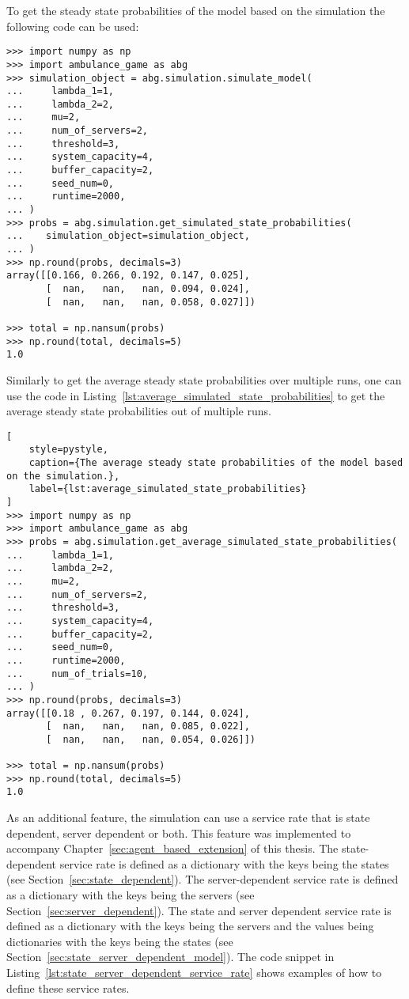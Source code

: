 To get the steady state probabilities of the model based on the simulation the
following code can be used:

\begin{lstlisting}[style=pystyle]
>>> import numpy as np
>>> import ambulance_game as abg
>>> simulation_object = abg.simulation.simulate_model(
...     lambda_1=1,
...     lambda_2=2,
...     mu=2,
...     num_of_servers=2,
...     threshold=3,
...     system_capacity=4,
...     buffer_capacity=2,
...     seed_num=0,
...     runtime=2000,
... )
>>> probs = abg.simulation.get_simulated_state_probabilities(
...    simulation_object=simulation_object,
... )
>>> np.round(probs, decimals=3)
array([[0.166, 0.266, 0.192, 0.147, 0.025],
       [  nan,   nan,   nan, 0.094, 0.024],
       [  nan,   nan,   nan, 0.058, 0.027]])

>>> total = np.nansum(probs)
>>> np.round(total, decimals=5)
1.0

\end{lstlisting}

Similarly to get the average steady state probabilities over multiple runs,
one can use the code in Listing~\ref{lst:average_simulated_state_probabilities}
to get the average steady state probabilities out of multiple runs.

\begin{lstlisting}[
    style=pystyle,
    caption={The average steady state probabilities of the model based on the simulation.},
    label={lst:average_simulated_state_probabilities}
]
>>> import numpy as np
>>> import ambulance_game as abg
>>> probs = abg.simulation.get_average_simulated_state_probabilities(
...     lambda_1=1,
...     lambda_2=2,
...     mu=2,
...     num_of_servers=2,
...     threshold=3,
...     system_capacity=4,
...     buffer_capacity=2,
...     seed_num=0,
...     runtime=2000,
...     num_of_trials=10,
... )
>>> np.round(probs, decimals=3)
array([[0.18 , 0.267, 0.197, 0.144, 0.024],
       [  nan,   nan,   nan, 0.085, 0.022],
       [  nan,   nan,   nan, 0.054, 0.026]])

>>> total = np.nansum(probs)
>>> np.round(total, decimals=5)
1.0

\end{lstlisting}

As an additional feature, the simulation can use a service rate that is state
dependent, server dependent or both.
This feature was implemented to accompany
Chapter~\ref{sec:agent_based_extension} of this thesis.
The state-dependent service rate is defined as a dictionary with the keys
being the states (see Section~\ref{sec:state_dependent}).
The server-dependent service rate is defined as a dictionary with the keys
being the servers (see Section~\ref{sec:server_dependent}).
The state and server dependent service rate is defined as a dictionary with
the keys being the servers and the values being dictionaries with the keys
being the states (see Section~\ref{sec:state_server_dependent_model}).
The code snippet in Listing~\ref{lst:state_server_dependent_service_rate} shows
examples of how to define these service rates.


